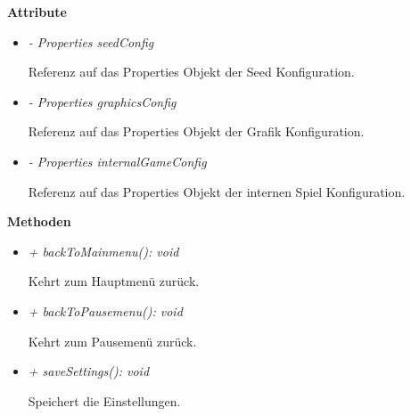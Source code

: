             \textbf{Attribute}
            \begin{itemize}
                \item \textit{- Properties seedConfig}  
                    \begin{leftbar}[0.9\linewidth]
                        Referenz auf das Properties Objekt der Seed Konfiguration.
                    \end{leftbar}
                \item  \textit{- Properties graphicsConfig} 
                    \begin{leftbar}[0.9\linewidth]
                        Referenz auf das Properties Objekt der Grafik Konfiguration.
                    \end{leftbar}
                \item  \textit{- Properties internalGameConfig} 
                    \begin{leftbar}[0.9\linewidth]
                        Referenz auf das Properties Objekt der internen Spiel Konfiguration.
                    \end{leftbar}
            \end{itemize}
               
            \textbf{Methoden}					
            \begin{itemize}
                \item  \textit{+ backToMainmenu(): void} 
                    \begin{leftbar}[0.9\linewidth]
                        Kehrt zum Hauptmenü zurück.\\
                    \end{leftbar}
                \item  \textit{+ backToPausemenu(): void} 
                    \begin{leftbar}[0.9\linewidth]
                        Kehrt zum Pausemenü zurück.\\
                    \end{leftbar}
                \item  \textit{+ saveSettings(): void} 
                    \begin{leftbar}[0.9\linewidth]
                        Speichert die Einstellungen.\\
                    \end{leftbar}
            \end{itemize}

        \pagebreak
